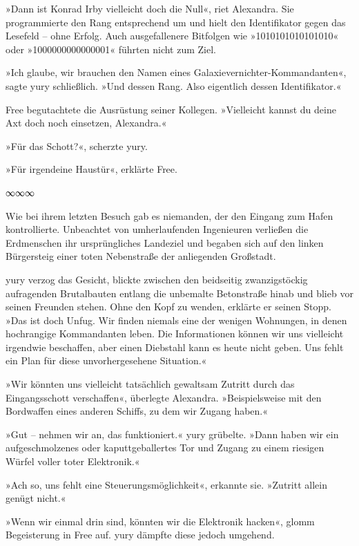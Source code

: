 »Dann ist Konrad Irby vielleicht doch die Null«, riet Alexandra. Sie programmierte den Rang entsprechend um und hielt den Identifikator gegen das Lesefeld – ohne Erfolg. Auch ausgefallenere Bitfolgen wie »1010101010101010« oder »1000000000000001« führten nicht zum Ziel.

»Ich glaube, wir brauchen den Namen eines Galaxievernichter-Kommandanten«, sagte yury schließlich. »Und dessen Rang. Also eigentlich dessen Identifikator.«

Free begutachtete die Ausrüstung seiner Kollegen. »Vielleicht kannst du deine Axt doch noch einsetzen, Alexandra.«

»Für das Schott?«, scherzte yury.

»Für irgendeine Haustür«, erklärte Free.

\begin{center}
∞∞∞
\end{center}

Wie bei ihrem letzten Besuch gab es niemanden, der den Eingang zum Hafen kontrollierte. Unbeachtet von umherlaufenden Ingenieuren verließen die Erdmenschen ihr ursprüngliches Landeziel und begaben sich auf den linken Bürgersteig einer toten Nebenstraße der anliegenden Großstadt.

yury verzog das Gesicht, blickte zwischen den beidseitig zwanzigstöckig aufragenden Brutalbauten entlang die unbemalte Betonstraße hinab und blieb vor seinen Freunden stehen. Ohne den Kopf zu wenden, erklärte er seinen Stopp. »Das ist doch Unfug. Wir finden niemals eine der wenigen Wohnungen, in denen hochrangige Kommandanten leben. Die Informationen können wir uns vielleicht irgendwie beschaffen, aber einen Diebstahl kann es heute nicht geben. Uns fehlt ein Plan für diese unvorhergesehene Situation.«

»Wir könnten uns vielleicht tatsächlich gewaltsam Zutritt durch das Eingangsschott verschaffen«, überlegte Alexandra. »Beispielsweise mit den Bordwaffen eines anderen Schiffs, zu dem wir Zugang haben.«

»Gut – nehmen wir an, das funktioniert.« yury grübelte. »Dann haben wir ein aufgeschmolzenes oder kaputtgeballertes Tor und Zugang zu einem riesigen Würfel voller toter Elektronik.«

»Ach so, uns fehlt eine Steuerungsmöglichkeit«, erkannte sie. »Zutritt allein genügt nicht.«

»Wenn wir einmal drin sind, könnten wir die Elektronik hacken«, glomm Begeisterung in Free auf. yury dämpfte diese jedoch umgehend.


